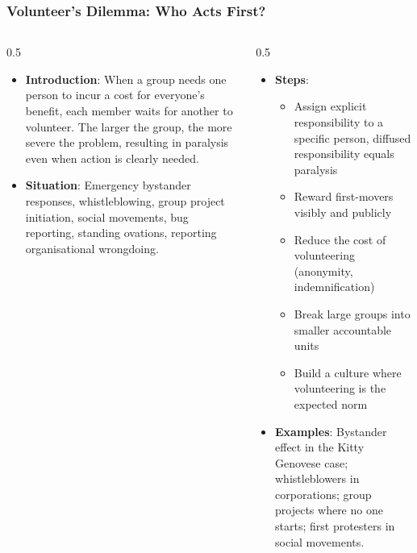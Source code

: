 \begin{frame}[fragile]\frametitle{Volunteer's Dilemma: Who Acts First?}
\begin{columns}
    \begin{column}[T]{0.5\linewidth}
      \begin{itemize}
        \item \textbf{Introduction}: When a group needs one person to incur a cost for everyone's benefit, each member waits for another to volunteer. The larger the group, the more severe the problem, resulting in paralysis even when action is clearly needed.
        \item \textbf{Situation}: Emergency bystander responses, whistleblowing, group project initiation, social movements, bug reporting, standing ovations, reporting organisational wrongdoing.
      \end{itemize}
    \end{column}
    \begin{column}[T]{0.5\linewidth}
      \begin{itemize}
        \item \textbf{Steps}:
        \begin{itemize}
          \item Assign explicit responsibility to a specific person, diffused responsibility equals paralysis
          \item Reward first-movers visibly and publicly
          \item Reduce the cost of volunteering (anonymity, indemnification)
          \item Break large groups into smaller accountable units
          \item Build a culture where volunteering is the expected norm
        \end{itemize}\item \textbf{Examples}: Bystander effect in the Kitty Genovese case; whistleblowers in corporations; group projects where no one starts; first protesters in social movements.
      \end{itemize}
    \end{column}
  \end{columns}
\end{frame}

